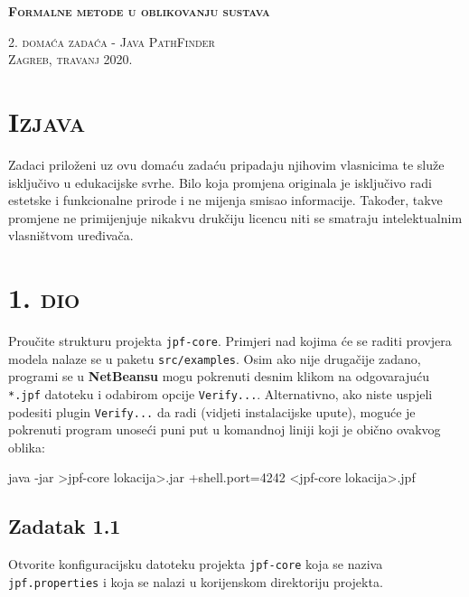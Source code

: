 \documentclass{article}
\newcommand{\sekcija}[1]{\section{\textsc{#1}}}
\newcommand{\dio}[1]{\sekcija{#1. dio}}
\newcommand{\zadatak}[1]{\subsection{Zadatak #1}}
\begin{document}
\begin{titlepage}
    \centering
    \vspace*{\fill}

    \huge
    \textbf{\textsc{Formalne metode u oblikovanju sustava}} \\
    
    \vspace*{0.5cm}
    
    \large
    \textsc{2. domaća zadaća - Java PathFinder} \\

    \vspace*{\fill}
    \textsc{Zagreb, travanj 2020.}
\end{titlepage}

\tableofcontents
\pagebreak



\sekcija{Izjava}

Zadaci priloženi uz ovu domaću zadaću pripadaju njihovim vlasnicima te služe isključivo u edukacijske svrhe. Bilo koja promjena originala je isključivo radi estetske i funkcionalne prirode i ne mijenja smisao informacije. Također, takve promjene ne primijenjuje nikakvu drukčiju licencu niti se smatraju intelektualnim vlasništvom uređivača.
\newline

\pagebreak





\dio{1}

Proučite strukturu projekta \texttt{jpf-core}. Primjeri nad kojima će se raditi provjera modela nalaze se u paketu \texttt{src/examples}. Osim ako nije drugačije zadano, programi se u \textbf{NetBeansu} mogu pokrenuti desnim klikom na odgovarajuću \texttt{*.jpf} datoteku i odabirom opcije \texttt{Verify...}. Alternativno, ako niste uspjeli podesiti plugin \texttt{Verify...} da radi (vidjeti instalacijske upute), moguće je pokrenuti program unoseći puni put u komandnoj liniji koji je obično ovakvog oblika:

\begin{ccode}
java -jar >jpf-core lokacija>\build\RunJPF.jar +shell.port=4242 <jpf-core lokacija>\src\examples\HelloWorld.jpf
\end{ccode}



\zadatak{1.1}

Otvorite konfiguracijsku datoteku projekta \texttt{jpf-core} koja se naziva
\texttt{jpf.properties} i koja se nalazi u korijenskom direktoriju projekta. \newline
\end{document}
